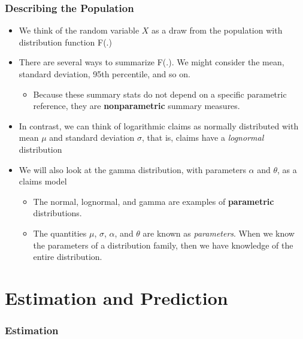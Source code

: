 \documentclass[]{book}
\providecommand{\tightlist}{%
  \setlength{\itemsep}{0pt}\setlength{\parskip}{0pt}}
\begin{document}
\subsubsection{Describing the
Population}\label{describing-the-population}

\begin{itemize}
\item
  We think of the random variable \(X\) as a draw from the population
  with distribution function F(.)
\item
  There are several ways to summarize F(.). We might consider the mean,
  standard deviation, 95th percentile, and so on.

  \begin{itemize}
  \tightlist
  \item
    Because these summary stats do not depend on a specific parametric
    reference, they are \textbf{nonparametric} summary measures.
  \end{itemize}
\item
  In contrast, we can think of logarithmic claims as normally
  distributed with mean \(\mu\) and standard deviation \(\sigma\), that
  is, claims have a \emph{lognormal} distribution
\item
  We will also look at the gamma distribution, with parameters
  \(\alpha\) and \(\theta\), as a claims model

  \begin{itemize}
  \item
    The normal, lognormal, and gamma are examples of \textbf{parametric}
    distributions.
  \item
    The quantities \(\mu\), \(\sigma\), \(\alpha\), and \(\theta\) are
    known as \emph{parameters}. When we know the parameters of a
    distribution family, then we have knowledge of the entire
    distribution.
  \end{itemize}
\end{itemize}

\section{Estimation and Prediction}\label{estimation-and-prediction}

\subsubsection{Estimation}\label{estimation}
\end{document}
